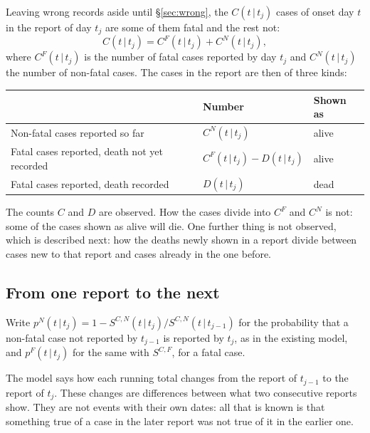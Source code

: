 \documentclass[11pt,a4paper]{article}
\newcommand{\given}{\,|\,}
\begin{document}
Leaving wrong records aside until \S\ref{sec:wrong}, the
$C(t\given t_j)$ cases of onset day $t$ in the report of day $t_j$ are some
of them fatal and the rest not:
\begin{equation}
C(t\given t_j)=C^{F}(t\given t_j)+C^{N}(t\given t_j),
\label{eq:observed}
\end{equation}
where $C^{F}(t\given t_j)$ is the number of fatal cases reported by day
$t_j$ and $C^{N}(t\given t_j)$ the number of non-fatal cases. The cases in
the report are then of three kinds:
\begin{center}
\begin{tabular}{lll}
\toprule
 & Number & Shown as \\
\midrule
Non-fatal cases reported so far & $C^{N}(t\given t_j)$ & alive \\
Fatal cases reported, death not yet recorded & $C^{F}(t\given t_j)-D(t\given t_j)$ & alive \\
Fatal cases reported, death recorded & $D(t\given t_j)$ & dead \\
\bottomrule
\end{tabular}
\end{center}
The counts $C$ and $D$ are observed. How the cases divide into $C^{F}$ and
$C^{N}$ is not: some of the cases shown as alive will die. One further thing
is not observed, which is described next: how the deaths newly shown in a
report divide between cases new to that report and cases already in the one
before.

\subsection{From one report to the next}

Write $p^{N}(t\given t_j)=1-S^{C,N}(t\given t_j)/S^{C,N}(t\given t_{j-1})$
for the probability that a non-fatal case not reported by $t_{j-1}$ is
reported by $t_j$, as in the existing model, and $p^{F}(t\given t_j)$ for
the same with $S^{C,F}$, for a fatal case.

The model says how each running total changes from the report of $t_{j-1}$
to the report of $t_j$. These changes are differences between what two
consecutive reports show. They are not events with their own dates: all
that is known is that something true of a case in the later report was not
true of it in the earlier one.
\end{document}
